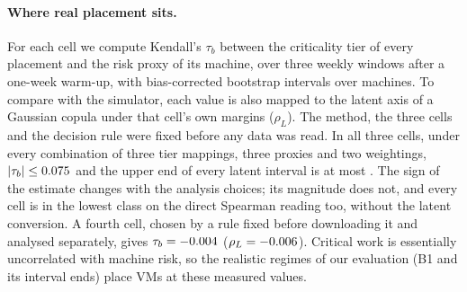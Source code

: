 \paragraph{Where real placement sits.}
\label{sec:rho}
For each cell we compute Kendall's $\tau_b$ between the criticality tier of every placement and
the risk proxy of its machine, over three weekly windows after a one-week warm-up, with
bias-corrected bootstrap intervals over machines. To compare with the simulator, each value is
also mapped to the latent axis of a Gaussian copula under that cell's own margins ($\rho_L$). The
method, the three cells and the decision rule were fixed before any data was read. In all three
cells, under every combination of three tier mappings, three proxies and two weightings,
$|\tau_b| \le 0.075$ and the upper end of every latent interval is at most
\VGOneMaxLatentUpper. The sign of the estimate changes with the analysis choices; its magnitude
does not, and every cell is in the lowest class on the direct Spearman reading too, without the
latent conversion. A fourth cell, chosen by a rule fixed before downloading it and analysed separately,
gives $\tau_b = -0.004$ ($\rho_L = -0.006$). Critical work is essentially uncorrelated
with machine risk, so the realistic regimes of our evaluation (B1 and its interval ends) place VMs
at these measured values.
